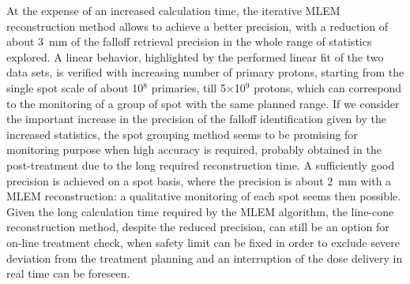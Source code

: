 At the expense of an increased calculation time, the iterative MLEM reconstruction method allows to achieve a better precision, with a reduction of about 3~mm of the falloff retrieval precision in the whole range of statistics explored. A linear behavior, highlighted by the performed linear fit of the two data sets, is verified with increasing number of primary protons, starting from the single spot scale of about 10$^8$ primaries, till 5$\times$10$^9$ protons, which can correspond to the monitoring of a group of spot with the same planned range. If we consider the important increase in the precision of the falloff identification given by the increased statistics, the spot grouping method seems to be promising for monitoring purpose when high accuracy is required, probably obtained in the post-treatment due to the long required reconstruction time. A sufficiently good precision is achieved on a spot basis, where the precision is about 2~mm with a MLEM reconstruction: a qualitative monitoring of each spot seems then possible. Given the long calculation time required by the MLEM algorithm, the line-cone reconstruction method, despite the reduced precision, can still be an option for on-line treatment check, when safety limit can be fixed in order to exclude severe deviation from the treatment planning and an interruption of the dose delivery in real time can be foreseen.          


